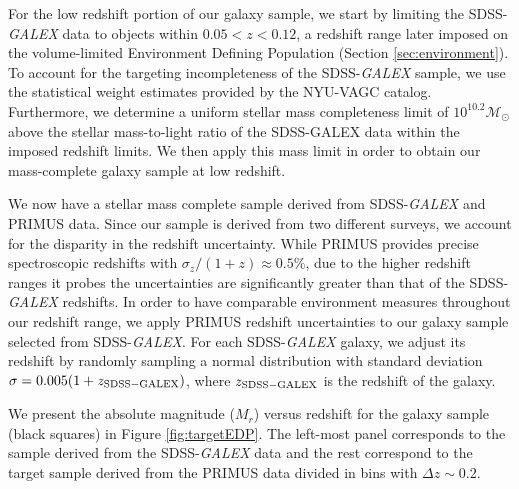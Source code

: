 \documentclass{emulateapj}
\begin{document}
For the low redshift portion of our galaxy sample, we start by limiting the SDSS-{\em GALEX} data to objects within $0.05 < z < 0.12$, a redshift range later imposed on the volume-limited Environment Defining Population (Section \ref{sec:environment}). To account for the targeting incompleteness of the SDSS-{\em GALEX} sample, we use the statistical weight estimates provided by the NYU-VAGC catalog. Furthermore, we determine a uniform stellar mass completeness limit of $10^{10.2} \mathcal{M}_{\odot}$ above the stellar mass-to-light ratio of the SDSS-{\rm GALEX} data within the imposed redshift limits. We then apply this mass limit in order to obtain our mass-complete galaxy sample at low redshift. 

We now have a stellar mass complete sample derived from SDSS-{\em GALEX} and PRIMUS data. Since our sample is derived from two different surveys, we account for the disparity in the redshift uncertainty. While PRIMUS provides precise spectroscopic redshifts with $\sigma_{z}/(1+z) \approx 0.5 \%$, due to the higher redshift ranges it probes the uncertainties are significantly greater than that of the SDSS-{\em GALEX} redshifts. In order to have comparable environment measures throughout our redshift range, we apply PRIMUS redshift uncertainties to our galaxy sample selected from SDSS-{\em GALEX}. For each SDSS-{\em GALEX} galaxy, we adjust its redshift by randomly sampling a normal distribution with standard deviation $\sigma = 0.005 (1+z_{\rm{SDSS}-GALEX})$, where $z_{\rm{SDSS}-GALEX}$ is the redshift of the galaxy. 

We present the absolute magnitude ($M_{r}$) versus redshift for the galaxy sample (black squares) in Figure \ref{fig:targetEDP}. The left-most panel corresponds to the sample derived from the SDSS-{\em GALEX} data and the rest correspond to the target sample derived from the PRIMUS data divided in bins with $\Delta z \sim 0.2$. 
\end{document}
